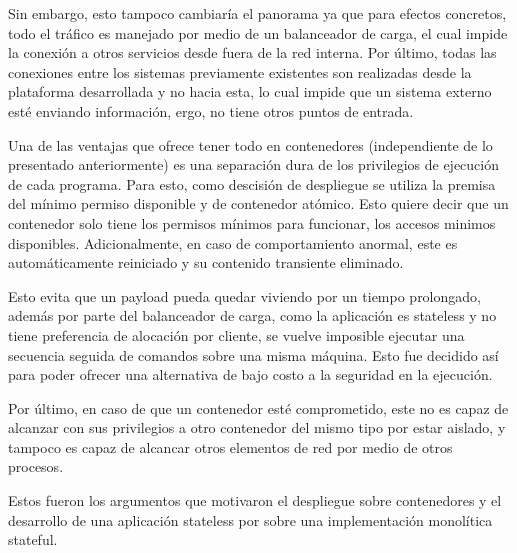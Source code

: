 Sin embargo, esto tampoco cambiaría el panorama ya que para efectos concretos, todo el tráfico es manejado por medio de un balanceador de carga, el cual impide la conexión a otros servicios desde fuera de la red interna. Por último, todas las conexiones entre los sistemas previamente existentes son realizadas desde la plataforma desarrollada y no hacia esta, lo cual impide que un sistema externo esté enviando información, ergo, no tiene otros puntos de entrada.

Una de las ventajas que ofrece tener todo en contenedores (independiente de lo presentado anteriormente) es una separación dura de los privilegios de ejecución de cada programa. Para esto, como descisión de despliegue se utiliza la premisa del mínimo permiso disponible y de contenedor atómico. Esto quiere decir que un contenedor solo tiene los permisos mínimos para funcionar, los accesos minimos disponibles. Adicionalmente, en caso de comportamiento anormal, este es automáticamente reiniciado y su contenido transiente eliminado. 

Esto evita que un payload pueda quedar viviendo por un tiempo prolongado, además por parte del balanceador de carga, como la aplicación es stateless y no tiene preferencia de alocación por cliente, se vuelve imposible ejecutar una secuencia seguida de comandos sobre una misma máquina. Esto fue decidido así para poder ofrecer una alternativa de bajo costo a la seguridad en la ejecución.

Por último, en caso de que un contenedor esté comprometido, este no es capaz de alcanzar con sus privilegios a otro contenedor del mismo tipo por estar aislado, y tampoco es capaz de alcancar otros elementos de red por medio de otros procesos.

Estos fueron los argumentos que motivaron el despliegue sobre contenedores y el desarrollo de una aplicación stateless por sobre una implementación monolítica stateful.
